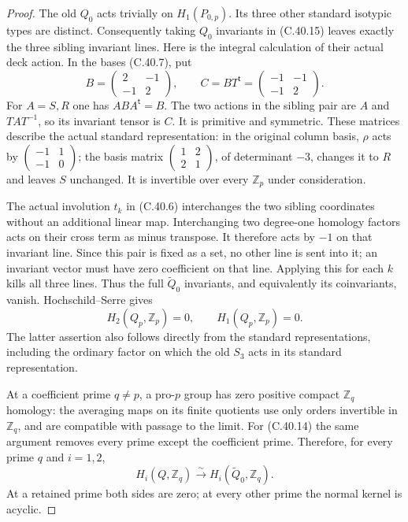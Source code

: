 \begin{proof}
The old $Q_0$ acts trivially on $H_1(P_{0,p})$.
Its three other standard isotypic types are distinct.
Consequently taking $Q_0$ invariants in (C.40.15)
leaves exactly the three sibling invariant lines.
Here is the integral calculation of their actual
deck action. In the bases (C.40.7), put
\[
 B=\begin{pmatrix}2&-1\\-1&2\end{pmatrix},\qquad
 C=BT^{\mathsf t}=
               \begin{pmatrix}-1&-1\\-1&2\end{pmatrix}.
                                                        \tag{C.40.16}
\]
For $A=S,R$ one has $ABA^{\mathsf t}=B$.
The two actions in the sibling pair are $A$ and
$TAT^{-1}$, so its invariant tensor is $C$. It is
primitive and symmetric. These matrices describe
the actual standard representation: in the original
column basis, $\rho$ acts by
$\left(\begin{smallmatrix}-1&1\\-1&0\end{smallmatrix}\right)$;
the basis matrix
$\left(\begin{smallmatrix}1&2\\2&1\end{smallmatrix}\right)$,
of determinant $-3$, changes it to $R$ and leaves $S$
unchanged. It is invertible over every $\mathbb Z_p$
under consideration.

The actual involution $t_k$ in (C.40.6) interchanges
the two sibling coordinates without an additional
linear map. Interchanging two degree-one homology
factors acts on their cross term as minus transpose.
It therefore acts by $-1$ on that invariant line.
Since this pair is fixed as a set, no other line is
sent into it; an invariant vector must have zero
coefficient on that line. Applying this for each
$k$ kills all three lines. Thus the full
$\widetilde Q_0$ invariants, and equivalently its
coinvariants, vanish. Hochschild--Serre gives
\[
                H_2(Q_p,\mathbb Z_p)=0,
                    \qquad H_1(Q_p,\mathbb Z_p)=0.      \tag{C.40.17}
\]
The latter assertion also follows directly from the
standard representations, including the ordinary
factor on which the old $S_3$ acts in its standard
representation.

At a coefficient prime $q\ne p$, a pro-$p$ group
has zero positive compact $\mathbb Z_q$ homology:
the averaging maps on its finite quotients use only
orders invertible in $\mathbb Z_q$, and are compatible
with passage to the limit. For (C.40.14) the same
argument removes every prime except the coefficient
prime. Therefore, for every prime $q$ and $i=1,2$,
\[
 H_i(Q,\mathbb Z_q)\xrightarrow{\sim}
                 H_i(\widetilde Q_0,\mathbb Z_q).       \tag{C.40.18}
\]
At a retained prime both sides are zero; at every
other prime the normal kernel is acyclic.


\end{proof}
